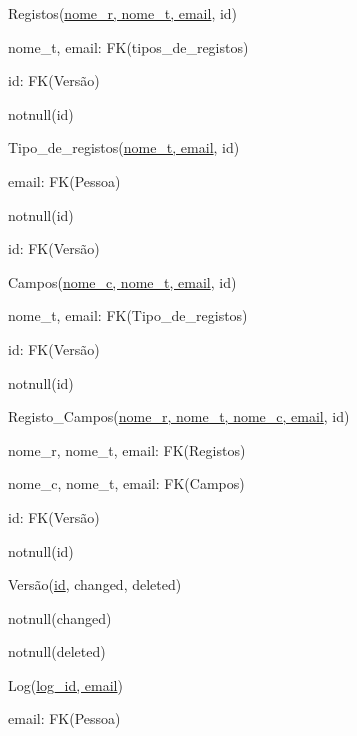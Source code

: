 \documentclass[11pt,a4paper]{article}
\begin{document}
\begin{description}[noitemsep]
	\item Registos(\underline{nome\_r, nome\_t, email}, id)
	\item nome\_t, email: FK(tipos\_de\_registos)
	\item id: FK(Vers\~{a}o)
	\item notnull(id)
\end{description}

\begin{description}[noitemsep]
	\item Tipo\_de\_registos(\underline{nome\_t, email}, id)
	\item email: FK(Pessoa)
	\item notnull(id)
	\item id: FK(Vers\~{a}o)
\end{description}
\newpage

\begin{description}[noitemsep]
	\item Campos(\underline{nome\_c, nome\_t, email}, id)
	\item nome\_t, email: FK(Tipo\_de\_registos)
	\item id: FK(Vers\~{a}o)
	\item notnull(id)
\end{description}

\begin{description}[noitemsep]
	\item Registo\_Campos(\underline{nome\_r, nome\_t, nome\_c, email}, id)
	\item nome\_r, nome\_t, email: FK(Registos)
	\item nome\_c, nome\_t, email: FK(Campos)
	\item id: FK(Vers\~{a}o)
	\item notnull(id)
\end{description}


\begin{description}[noitemsep]
	\item Vers\~{a}o(\underline{id}, changed, deleted)
	\item notnull(changed)
	\item notnull(deleted)
\end{description}

\begin{description}[noitemsep]
	\item Log(\underline{log\_id, email})
	\item email: FK(Pessoa)
\end{description}
\end{document}

